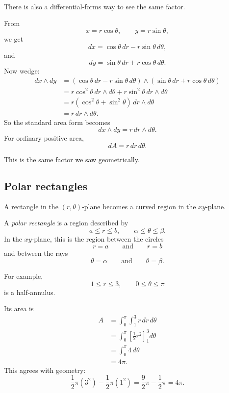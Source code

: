 There is also a differential-forms way to see the same factor.

From
\[
    x=r\cos\theta,
    \qquad
    y=r\sin\theta,
\]
we get
\[
    dx=\cos\theta\,dr-r\sin\theta\,d\theta,
\]
and
\[
    dy=\sin\theta\,dr+r\cos\theta\,d\theta.
\]
Now wedge:
\[
\begin{aligned}
    dx\wedge dy
    &=
    (\cos\theta\,dr-r\sin\theta\,d\theta)
    \wedge
    (\sin\theta\,dr+r\cos\theta\,d\theta)\\
    &=
    r\cos^2\theta\,dr\wedge d\theta
    +
    r\sin^2\theta\,dr\wedge d\theta\\
    &=
    r(\cos^2\theta+\sin^2\theta)\,dr\wedge d\theta\\
    &=
    r\,dr\wedge d\theta.
\end{aligned}
\]
So the standard area form becomes
\[
\boxed{
    dx\wedge dy=r\,dr\wedge d\theta.
}
\]
For ordinary positive area,
\[
\boxed{
    dA=r\,dr\,d\theta.
}
\]

This is the same factor we saw geometrically.

\subsection{Polar rectangles}

A rectangle in the \((r,\theta)\)-plane becomes a curved region in the \(xy\)-plane.

\begin{definition}
A \emph{polar rectangle} is a region described by
\[
\boxed{
    a\le r\le b,
    \qquad
    \alpha\le\theta\le\beta.
}
\]
In the \(xy\)-plane, this is the region between the circles
\[
    r=a
    \qquad\text{and}\qquad
    r=b
\]
and between the rays
\[
    \theta=\alpha
    \qquad\text{and}\qquad
    \theta=\beta.
\]
\end{definition}

For example,
\[
    1\le r\le3,
    \qquad
    0\le\theta\le\pi
\]
is a half-annulus.

Its area is
\[
\begin{aligned}
    A
    &=
    \int_0^\pi\int_1^3 r\,dr\,d\theta\\
    &=
    \int_0^\pi
    \left[
        \frac12r^2
    \right]_1^3
    d\theta\\
    &=
    \int_0^\pi 4\,d\theta\\
    &=
    4\pi.
\end{aligned}
\]
This agrees with geometry:
\[
    \frac12\pi(3^2)-\frac12\pi(1^2)=\frac92\pi-\frac12\pi=4\pi.
\]

